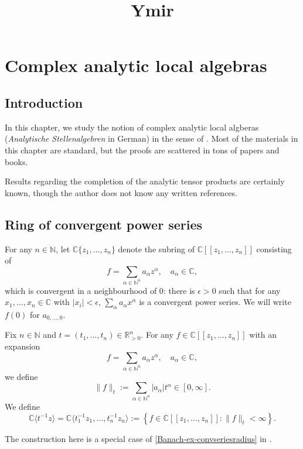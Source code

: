 




\title{Ymir}









%

\maketitle


\tableofcontents
\chapter*{Complex analytic local algebras}\label{chap-local}

\section{Introduction}\label{sec-introduction-Complexanalyticlocal}

In this chapter, we study the notion of complex analytic local algberas (\emph{Analytische Stellenalgebren} in German) in the sense of \cite{GR71}. Most of the materials in this chapter are standard, but the proofs are scattered in tons of papers and books.

Results regarding the completion of the analytic tensor products are certainly known, though the author does not know any written references.
\section{Ring of convergent power series}

\begin{definition}\label{def-ringconvpowerseries}
    For any $n\in \mathbb{N}$, let $\mathbb{C}\{ z_1,\ldots,z_n\}$ denote the subring of $\mathbb{C}[[z_1,\ldots,z_n]]$ consisting of
    \[
        f=\sum_{\alpha\in \mathbb{N}^n} a_{\alpha}z^{\alpha},\quad a_{\alpha}\in \mathbb{C},
    \]
    which is  convergent in a neighbourhood of $0$: there is $\epsilon>0$ such that for any $x_1,\ldots,x_n\in \mathbb{C}$ with $|x_i|<\epsilon$, $\sum_{\alpha}a_{\alpha} x^{\alpha}$ is a convergent power series. We will write $f(0)$ for $a_{0,\ldots,0}$.
\end{definition}

\begin{definition}
    Fix $n\in \mathbb{N}$ and $t=(t_1,\ldots,t_n)\in \mathbb{R}_{> 0}^n$. For any $f\in \mathbb{C}[[z_1,\ldots,z_n]]$ with an expansion
    \[
        f=\sum_{\alpha\in \mathbb{N}^n} a_{\alpha}z^{\alpha},\quad a_{\alpha}\in \mathbb{C},  
    \]
    we define
    \[
        \|f\|_t:=\sum_{\alpha\in \mathbb{N}^n} |a_{\alpha}| t^{\alpha}\in [0,\infty].
    \]
    We define
    \[
        \mathbb{C}\langle t^{-1}z\rangle =\mathbb{C}\langle t_1^{-1}z_1,\ldots,t_n^{-1}z_n \rangle:=\left\{f\in \mathbb{C}[[z_1,\ldots,z_n]]: \|f\|_t<\infty \right\}.
    \]
\end{definition}
The construction here is a special case of \cref{Banach-ex-convseriesradius} in .

